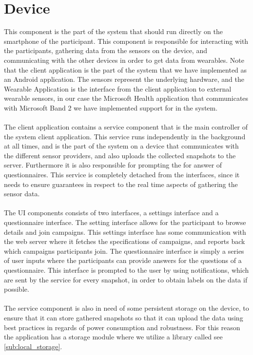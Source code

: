 \section{Device}
\label{sec:device}
This component is the part of the system that should run directly on the smartphone of the participant. This component is responsible for interacting with the participants, gathering data from the sensors on the device, and communicating with the other devices in order to get data from wearables. Note that the client application is the part of the system that we have implemented as an Android application. The sensors represent the underlying hardware, and the Wearable Application is the interface from the client application to external wearable sensors, in our case the Microsoft Health application that communicates with Microsoft Band 2 we have implemented support for in the system.
\\\\
The client application contains a service component that is the main controller of the system client application. This service runs independently in the background at all times, and is the part of the system on a device that communicates with the different sensor providers, and also uploads the collected snapshots to the server. Furthermore it is also responsible for prompting the for answer of questionnaires. This service is completely detached from the interfaces, since it needs to ensure guarantees in respect to the real time aspects of gathering the sensor data.
\\\\
The UI components consists of two interfaces, a settings interface and a questionnaire interface. The setting interface allows for the participant to browse details and join campaigns. This settings interface has some communication with the web server where it fetches the specifications of campaigns, and reports back which campaigns participants join. The questionnaire interface is simply a series of user inputs where the participants can provide answers for the questions of a questionnaire. This interface is prompted to the user by using notifications, which are sent by the service for every snapshot, in order to obtain labels on the data if possible.
\\\\
The service component is also in need of some persistent storage on the device, to ensure that it can store gathered snapshots so that it can upload the data using best practices in regards of power consumption and robustness. For this reason the application has a storage module where we utilize a library called  see \ref{sub:local_storage}.
